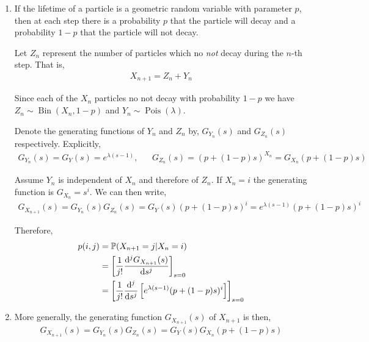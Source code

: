 \begin{solution}[Solution]
\begin{enumerate}[label=(\alph*)]
    \item
        If the lifetime of a particle is a geometric random variable with parameter \( p \), then at each step there is a probability \( p \) that the particle will decay and a probability \( 1-p \) that the particle will not decay.

        Let \( Z_n \) represent the number of particles which no \textit{not} decay during the \( n \)-th step. That is,
        \begin{align*}
            X_{n+1} = Z_n + Y_n 
        \end{align*}
        
        Since each of the \( X_n \) particles no not decay with probability \( 1-p \) we have \( Z_n \sim \operatorname{Bin}(X_n,1-p) \) and \( Y_n \sim \operatorname{Pois}(\lambda) \).

        Denote the generating functions of \( Y_n \) and \( Z_n \) by, \( G_{Y_n}(s) \) and \( G_{Z_n}(s) \) respectively.
        Explicitly,
        \begin{align*}
            G_{Y_n}(s) = G_Y(s) = e^{\lambda(s-1)}, &&
            G_{Z_n}(s) = (p+(1-p)s)^{X_n} = G_{X_n}(p+(1-p)s)
        \end{align*}
        
        Assume \( Y_n \) is independent of \( X_n \) and therefore of \( Z_n \). 
        If \( X_n = i \) the generating function is \( G_{X_n} = s^i \). We can then write,
        \begin{align*}
            G_{X_{n+1}}(s) = G_{Y_n}(s)G_{Z_n}(s) = G_Y(s) (p+(1-p)s)^i = e^{\lambda(s-1)} (p+(1-p)s)^i
        \end{align*}

        Therefore,
        \begin{align*}
            p(i,j) &= \PP(X_{n+1} = j | X_n = i) 
            \\&= \left[\frac{1}{j!} \dd[j]{G_{X_{n+1}}(s)}{s} \right]_{s=0}
            \\&= \left[\frac{1}{j!} \dd[j]{}{s} \left[ e^{\lambda(s-1)}(p+(1-p)s)^i \right] \right]_{s=0}
        \end{align*}

       
    \item 
        More generally, the generating function \( G_{X_{n+1}}(s) \) of \( X_{n+1} \) is then,
        \begin{align*}
            G_{X_{n+1}}(s) = G_{Y_n}(s)G_{Z_n}(s) = G_{Y}(s)G_{X_{n}}(p+(1-p)s) 
        \end{align*}
        

\end{enumerate}
\end{solution}
